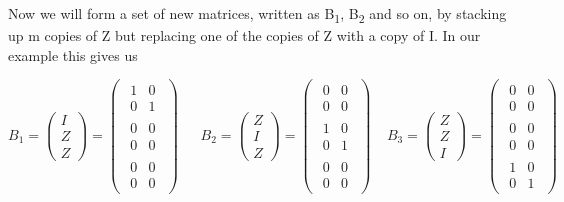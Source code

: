 \documentclass[oneside,english]{amsbook}
\numberwithin{section}{chapter}
\theoremstyle{plain}
\theoremstyle{definition}
\begin{document}
Now we will form a set of new matrices, written as B\textsubscript{1},
B\textsubscript{2} and so on, by stacking up m copies of Z but replacing
one of the copies of Z with a copy of I. In our example this gives us

\[B_{1} = \begin{pmatrix}
	I \\
	Z \\
	Z
\end{pmatrix} = \begin{pmatrix}
	\begin{matrix}
		1 & 0 \\
		0 & 1
	\end{matrix} \\
	\begin{matrix}
		0 & 0 \\
		0 & 0
	\end{matrix} \\
	\begin{matrix}
		0 & 0 \\
		0 & 0
	\end{matrix}
\end{pmatrix}\ \ \ \ \ \ \ B_{2} = \begin{pmatrix}
	Z \\
	I \\
	Z
\end{pmatrix} = \begin{pmatrix}
	\begin{matrix}
		0 & 0 \\
		0 & 0
	\end{matrix} \\
	\begin{matrix}
		1 & 0 \\
		0 & 1
	\end{matrix} \\
	\begin{matrix}
		0 & 0 \\
		0 & 0
	\end{matrix}
\end{pmatrix}\ \ \ \ \ B_{3} = \begin{pmatrix}
	Z \\
	Z \\
	I
\end{pmatrix} = \begin{pmatrix}
	\begin{matrix}
		0 & 0 \\
		0 & 0
	\end{matrix} \\
	\begin{matrix}
		0 & 0 \\
		0 & 0
	\end{matrix} \\
	\begin{matrix}
		1 & 0 \\
		0 & 1
	\end{matrix}
\end{pmatrix}\]
\end{document}
